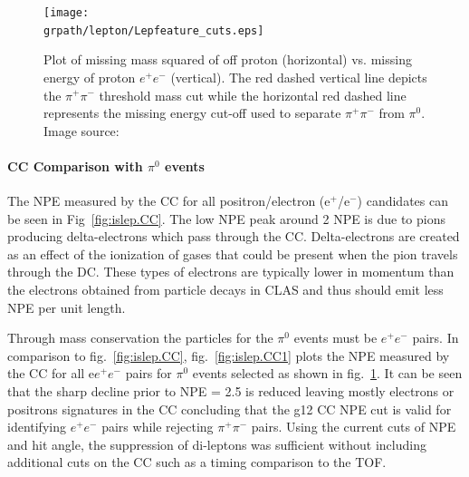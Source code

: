 	
\begin{figure}[h!]\begin{center}
			\texttt{[image: \\grpath/lepton/Lepfeature\_cuts.eps]}
			\caption[Cuts Applied to Isolate $\pi^0$ and $\pi^+\pi^-$ for PID Validation]{\label{fig:islep.cuts}Plot of missing mass squared of off proton (horizontal) vs. missing energy of proton $e^+e^-$ (vertical). The red dashed vertical line depicts the $\pi^+\pi^-$ threshold mass cut while the horizontal red dashed line represents the missing energy cut-off used to separate $\pi^+\pi^-$ from $\pi^0$. Image source:~\cite{thesiskunkel,g12note}}
\end{center}\end{figure}
\FloatBarrier
\paragraph{\label{sec:data.lepton.cc}CC Comparison with $\pi^0$ events}

The NPE measured by the CC for all positron/electron (e$^+$/e$^-$) candidates can be seen in Fig~\ref{fig:islep.CC}. The low NPE peak around 2 NPE is due to pions producing delta-electrons which pass through the CC. Delta-electrons are created as an effect of the ionization of gases that could be present when the pion travels through the DC. These types of electrons are typically lower in momentum than the electrons obtained from particle decays in CLAS and thus should emit less NPE per unit length.

Through mass conservation the particles for the $\pi^0$ events must be $e^+e^-$ pairs. In comparison to fig.~\ref{fig:islep.CC}, fig.~\ref{fig:islep.CC1} plots the NPE measured by the CC for all e$e^+e^-$ pairs for $\pi^0$ events selected as shown in fig.~\ref{fig:islep.cuts}. It can be seen that the sharp decline prior to NPE = 2.5 is reduced leaving mostly electrons or positrons signatures in the CC concluding that the g12 CC NPE cut is valid for identifying $e^+e^-$ pairs while rejecting $\pi^+\pi^-$ pairs.
Using the current cuts of NPE and hit angle, the suppression of di-leptons was sufficient without including additional cuts on the CC such as a timing comparison to the TOF.

